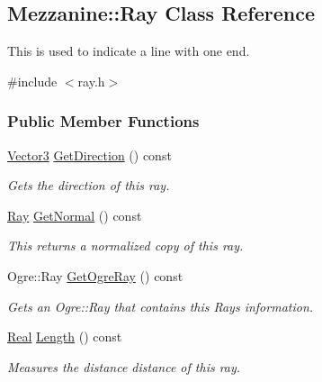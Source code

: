 \hypertarget{classMezzanine_1_1Ray}{
\subsection{Mezzanine::Ray Class Reference}
\label{classMezzanine_1_1Ray}
}


This is used to indicate a line with one end.  




{\ttfamily \#include $<$ray.h$>$}

\subsubsection*{Public Member Functions}
\begin{DoxyCompactItemize}
\item 
\hyperlink{classMezzanine_1_1Vector3}{Vector3} \hyperlink{classMezzanine_1_1Ray_a25326a57c34b359064c9161ed2eeb004}{GetDirection} () const 
\begin{DoxyCompactList}\small\item\em Gets the direction of this ray. \item\end{DoxyCompactList}\item 
\hyperlink{classMezzanine_1_1Ray}{Ray} \hyperlink{classMezzanine_1_1Ray_a7164d929caf75bcebceed9149e9a3540}{GetNormal} () const 
\begin{DoxyCompactList}\small\item\em This returns a normalized copy of this ray. \item\end{DoxyCompactList}\item 
Ogre::Ray \hyperlink{classMezzanine_1_1Ray_af0dad9b998e8825d102d9da80fda10aa}{GetOgreRay} () const 
\begin{DoxyCompactList}\small\item\em Gets an Ogre::Ray that contains this Rays information. \item\end{DoxyCompactList}\item 
\hyperlink{namespaceMezzanine_a726731b1a7df72bf3583e4a97282c6f6}{Real} \hyperlink{classMezzanine_1_1Ray_a5c02a547876c4f590af181acdc81b486}{Length} () const 
\begin{DoxyCompactList}\small\item\em Measures the distance distance of this ray. \item\end{DoxyCompactList}\item 

\end{DoxyCompactItemize}
